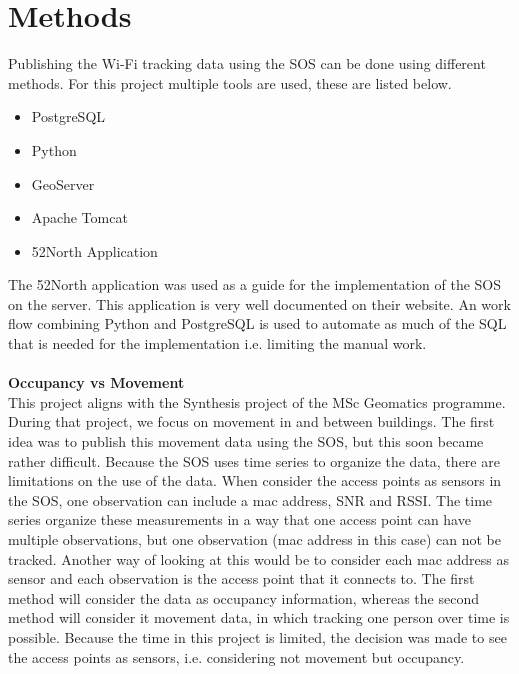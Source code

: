 \section{Methods}
Publishing the Wi-Fi tracking data using the SOS can be done using different methods. For this project multiple tools are used, these are listed below. 
\begin{itemize}
\item PostgreSQL
\item Python
\item GeoServer
\item Apache Tomcat
\item 52North Application
\end{itemize}
The 52North application was used as a guide for the implementation of the SOS on the server. This application is very well documented on their website. An work flow combining Python and PostgreSQL is used to automate as much of the SQL that is needed for the implementation i.e. limiting the manual work.\\\\
\textbf{Occupancy vs Movement}\\
This project aligns with the Synthesis project of the MSc Geomatics programme. During that project, we focus on movement in and between buildings. The first idea was to publish this movement data using the SOS, but this soon became rather difficult. Because the SOS uses time series to organize the data, there are limitations on the use of the data. When consider the access points as sensors in the SOS, one observation can include a mac address, SNR and RSSI. The time series organize these measurements in a way that one access point can have multiple observations, but one observation (mac address in this case) can not be tracked. Another way of looking at this would be to consider each mac address as sensor and each observation is the access point that it connects to. The first method will consider the data as occupancy information, whereas the second method will consider it movement data, in which tracking one person over time is possible. Because the time in this project is limited, the decision was made to see the access points as sensors, i.e. considering not movement but occupancy. 